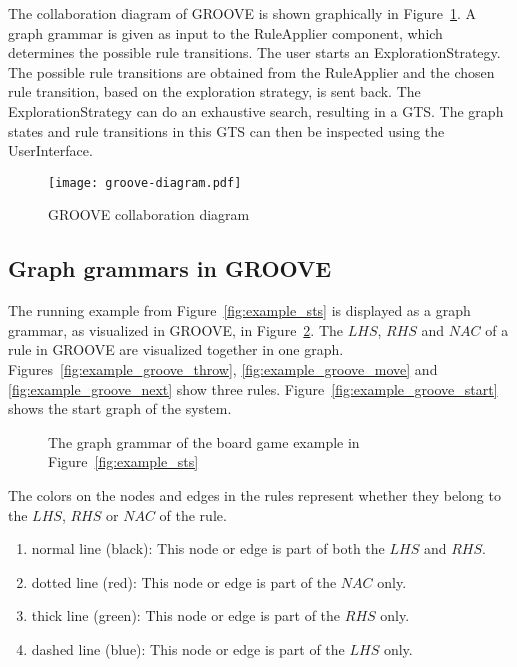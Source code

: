 The collaboration diagram of GROOVE is shown graphically in Figure~\ref{fig:groove_tool}. A graph grammar is given as input to the RuleApplier component, which determines the possible rule transitions. The user starts an ExplorationStrategy. The possible rule transitions are obtained from the RuleApplier and the chosen rule transition, based on the exploration strategy, is sent back. The ExplorationStrategy can do an exhaustive search, resulting in a GTS. The graph states and rule transitions in this GTS can then be inspected using the UserInterface.

\begin{figure}[ht]
  \begin{center}
    \texttt{[image: groove-diagram.pdf]}
  \end{center}
  \caption{GROOVE collaboration diagram}
  \label{fig:groove_tool}
\end{figure}

\subsection{Graph grammars in GROOVE}\label{sec:example_groove} 
The running example from Figure~\ref{fig:example_sts} is displayed as a graph grammar, as visualized in GROOVE, in Figure~\ref{fig:example_groove}. The $\mathit{LHS}$, $\mathit{RHS}$ and $\mathit{NAC}$ of a rule in GROOVE are visualized together in one graph. Figures~\ref{fig:example_groove_throw}, \ref{fig:example_groove_move} and \ref{fig:example_groove_next} show three rules. Figure~\ref{fig:example_groove_start} shows the start graph of the system.

\begin{figure}[ht]
  \begin{center}
    \quad
  \end{center}
  \caption{The graph grammar of the board game example in Figure~\ref{fig:example_sts}}
  \label{fig:example_groove}
\end{figure}

The colors on the nodes and edges in the rules represent whether they belong to the $\mathit{LHS}$, $\mathit{RHS}$ or $\mathit{NAC}$ of the rule.
\begin{enumerate}
  \item normal line (black): This node or edge is part of both the $\mathit{LHS}$ and $\mathit{RHS}$.
  \item dotted line (red): This node or edge is part of the $\mathit{NAC}$ only.
  \item thick line (green): This node or edge is part of the $\mathit{RHS}$ only.
  \item dashed line (blue): This node or edge is part of the $\mathit{LHS}$ only.
\end{enumerate}


